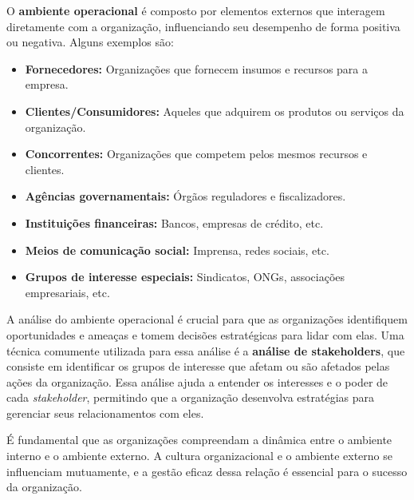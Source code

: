 O \textbf{ambiente operacional} é composto por elementos externos que interagem diretamente com a organização, influenciando seu desempenho de forma positiva ou negativa. Alguns exemplos são:

\begin{itemize}
    \item \textbf{Fornecedores:} Organizações que fornecem insumos e recursos para a empresa.
    \item \textbf{Clientes/Consumidores:} Aqueles que adquirem os produtos ou serviços da organização.
    \item \textbf{Concorrentes:} Organizações que competem pelos mesmos recursos e clientes.
    \item \textbf{Agências governamentais:} Órgãos reguladores e fiscalizadores.
    \item \textbf{Instituições financeiras:} Bancos, empresas de crédito, etc.
    \item \textbf{Meios de comunicação social:} Imprensa, redes sociais, etc.
    \item \textbf{Grupos de interesse especiais:} Sindicatos, ONGs, associações empresariais, etc.
\end{itemize}

A análise do ambiente operacional é crucial para que as organizações identifiquem oportunidades e ameaças e tomem decisões estratégicas para lidar com elas. Uma técnica comumente utilizada para essa análise é a \textbf{análise de stakeholders}, que consiste em identificar os grupos de interesse que afetam ou são afetados pelas ações da organização. Essa análise ajuda a entender os interesses e o poder de cada \textit{stakeholder}, permitindo que a organização desenvolva estratégias para gerenciar seus relacionamentos com eles.

É fundamental que as organizações compreendam a dinâmica entre o ambiente interno e o ambiente externo. A cultura organizacional e o ambiente externo se influenciam mutuamente, e a gestão eficaz dessa relação é essencial para o sucesso da organização.
